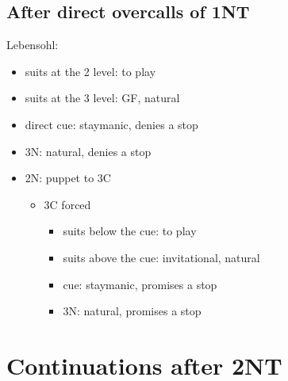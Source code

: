 \documentclass[a4paper,12pt]{article}
\begin{document}
\subsection{After direct overcalls of 1NT}

Lebensohl:

\begin{itemize}
\item suits at the 2 level: to play
\item suits at the 3 level: GF, natural
\item direct cue: staymanic, denies a stop
\item 3N: natural, denies a stop
\item 2N: puppet to 3C
	\begin{itemize}
	\item 3C forced
		\begin{itemize}
		\item suits below the cue: to play
		\item suits above the cue: invitational, natural
		\item cue: staymanic, promises a stop
		\item 3N: natural, promises a stop
		\end{itemize}
	\end{itemize}
\end{itemize}

\section{Continuations after 2NT}
\end{document}
